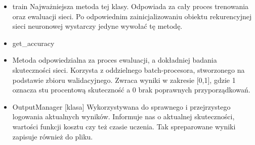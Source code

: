 \begin{itemize}

  \item{train}
  \newline Najważniejsza metoda tej klasy. Odpowiada za cały proces trenowania oraz ewaluacji sieci. Po 
  odpowiednim zainicjalizowaniu obiektu rekurencyjnej sieci neuronowej wystarczy jedyne wywołać tę metodę.
  \item{get\_accuracy}
  \item {}
  \newline Metoda odpowiedzialna za proces ewaluacji, a dokładniej badania skuteczności sieci. Korzysta z 
  oddzielnego batch-procesora, stworzonego na podstawie zbioru walidacyjnego. Zwraca wyniki w zakresie
  [0,1], gdzie 1 oznacza stu procentową skuteczność a 0 brak poprawnych przyporządkowań.
  \item{OutputManager [klasa]}
  \newline Wykorzystywana do sprawnego i przejrzystego logowania aktualnych wyników. Informuje nas o aktualnej
  skuteczności, wartości funkcji kosztu czy też czasie uczenia. Tak spreparowane wyniki zapisuje również do pliku.

\end{itemize}